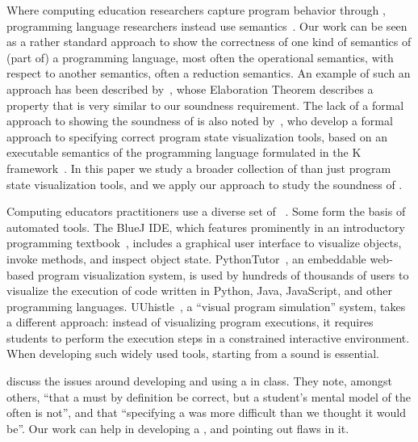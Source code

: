 Where computing education researchers capture program behavior through \nms{}, programming language researchers instead use semantics~\cite{krishnamurthiProgrammingParadigms2019}. Our work can be seen as a rather standard approach to show the correctness of one kind of semantics of (part of) a programming language, most often the operational semantics, with respect to another semantics, often a reduction semantics. An example of such an approach has been described by~\citet{clementsModelingAlgebraicStepper2001}, whose Elaboration Theorem describes a property that is very similar to our soundness requirement.
%
The lack of a formal approach to showing the soundness of \nms{} is also noted by~\citet{pollockTheiaAutomaticallyGenerating2019}, who develop a formal approach to specifying correct program state visualization tools, based on an executable semantics of the programming language formulated in the K framework~\citep{rosuOverviewSemanticFramework2010}.
In this paper we study a broader collection of \nms{} than just program state visualization tools, and we apply our approach to study the soundness of \nms{}.



Computing educators practitioners use a diverse set of \nms{}~\cite{fincherNotionalMachinesComputing2020}.
Some \nms{} form the basis of automated tools.
The BlueJ IDE,
which features prominently in an introductory programming textbook~\cite{kollingObjectsFirstJava2017},
includes a graphical user interface to visualize objects, invoke methods, and inspect object state.
PythonTutor~\cite{guoOnlinePythonTutor2013}, an embeddable web-based program visualization system,
is used by hundreds of thousands of users to visualize the execution of code written in Python, Java, JavaScript, and other programming languages.
UUhistle~\cite{sorvaUUhistleSoftwareTool2010}, a ``visual program simulation'' system, takes a different approach:
instead of visualizing program executions, it requires students to perform the execution steps in a constrained interactive environment.
When developing such widely used tools, starting from a sound \nm{} is essential.


\citet{dicksonExperiencesImplementingUtilizing2022} discuss the issues around developing and using a \nm{} in class. They note, amongst others, ``that a \nm{} must by definition be correct, but a student's mental model of the \nm{} often is not'', and that ``specifying a \nm{} was more difficult than we thought it would be''. Our work can help in developing a \nm{}, and pointing out flaws in it. 


